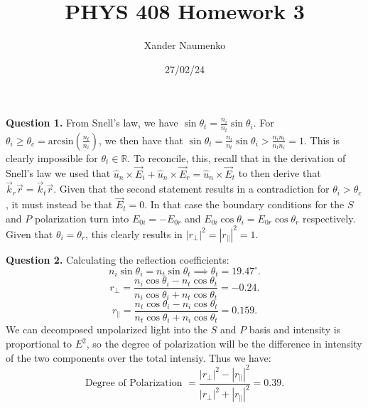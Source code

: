 \documentclass[letterpaper, reqno,11pt]{article}
\begin{document}
\title{PHYS 408 Homework 3}
\date{27/02/24}
\author{Xander Naumenko}
\maketitle

{\medskip\noindent\bf Question 1.} From Snell's law, we have $\sin \theta_t= \frac{n_i}{n_t}\sin\theta_i$. For $\theta_i\geq \theta_c=\text{arcsin}\left( \frac{n_t}{n_i} \right) $, we then have that $\sin\theta_t=\frac{n_i}{n_t}\sin\theta_i> \frac{n_in_t}{n_tn_i}=1$. This is clearly impossible for $\theta_t\in \mathbb{R}$. To reconcile, this, recall that in the derivation of Snell's law we used that $\hat{u}_n\times \vec E_i+\hat u_n\times \vec E_r=\hat u_n\times \vec E_t$ to then derive that $\vec k_r\vec r=\vec k_t\vec r$. Given that the second statement results in a contradiction for $\theta_i>\theta_c$, it must instead be that $\vec E_t=0$. In that case the boundary conditions for the $S$ and $P$ polarization turn into $E_{0i}=-E_{0r}$ and $E_{0i}\cos\theta_i=E_{0r}\cos\theta_r$ respectively. Given that $\theta_i=\theta_r$, this clearly results in $|r_{\perp}|^2=|r_{\parallel}|^2=1$.

{\medskip\noindent\bf Question 2.} Calculating the reflection coefficients:
\[
n_i\sin\theta_i=n_t\sin\theta_t \implies \theta_t = 19.47^{\circ}
.\]
\[
r_{\perp}= \frac{n_i\cos\theta_i-n_t\cos\theta_t}{n_i\cos\theta_i+n_t\cos\theta_t}=-0.24
.\]
\[
r_{\parallel}=\frac{n_t\cos\theta_i-n_i\cos\theta_t}{n_t\cos\theta_i+n_i\cos\theta_t}=0.159
.\]
We can decomposed unpolarized light into the $S$ and $P$ basis and intensity is proportional to $E^2$, so the degree of polarization will be the difference in intensity of the two components over the total intensiy. Thus we have:
\[
\text{Degree of Polarization }=\frac{|r_{\perp}|^2-|r_{\parallel}|^2}{|r_{\perp}|^2+|r_{\parallel}|^2}=0.39
.\]
\end{document}
